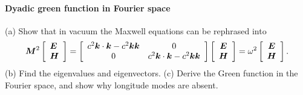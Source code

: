 \documentclass[hyperref, a4paper]{article}
\begin{document}
\paragraph{}

\paragraph{Dyadic green function in Fourier space} (a) Show that in vacuum the Maxwell equations can be rephrased 
into 
\begin{equation}
    \vb*{M}^{2}\left[\begin{array}{l}
        \vb*{E} \\
        \vb*{H}
        \end{array}\right]=\left[\begin{array}{cc}
        c^{2} \vb*{k} \cdot \vb*{k}-c^{2} \vb*{k} \vb*{k} & 0 \\
        0 & c^{2} \vb*{k} \cdot \vb*{k}-c^{2} \vb*{k} \vb*{k}
        \end{array}\right]\left[\begin{array}{c}
        \vb*{E} \\
        \vb*{H}
        \end{array}\right]=\omega^{2}\left[\begin{array}{c}
        \vb*{E} \\
        \vb*{H}
        \end{array}\right].
        \label{eq:maxwell-eigen}
\end{equation}
(b) Find the eigenvalues and eigenvectors. (c) Derive the Green function in the Fourier space, 
and show why longitude modes are absent.
\end{document}
